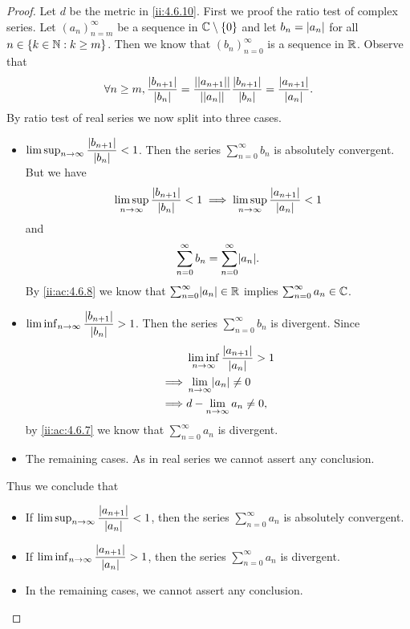 \begin{proof}
  Let \(d\) be the metric in \cref{ii:4.6.10}.
  First we proof the ratio test of complex series.
  Let \((a_n)_{n = m}^\infty\) be a sequence in \(\mathbb{C} \setminus \left\lbrace0\right\rbrace\) and let \(b_n = \left\lvert a_n\right\rvert\) for all \(n \in \left\lbrace k \in \mathbb{N} : k \geq m\right\rbrace\).
  Then we know that \((b_n)_{n = 0}^\infty\) is a sequence in \(\mathbb{R}\).
  Observe that
  \[
    \forall n \geq m, \dfrac{\left\lvert b_{n + 1}\right\rvert}{\left\lvert b_n\right\rvert} = \dfrac{\left\lvert\left\lvert a_{n + 1}\right\rvert\right\rvert}{\left\lvert\left\lvert a_n\right\rvert\right\rvert} \dfrac{\left\lvert b_{n + 1}\right\rvert}{\left\lvert b_n\right\rvert} = \dfrac{\left\lvert a_{n + 1}\right\rvert}{\left\lvert a_n\right\rvert}.
  \]
  By ratio test of real series we now split into three cases.
  \begin{itemize}
    \item \(\limsup_{n \to \infty} \dfrac{\left\lvert b_{n + 1}\right\rvert}{\left\lvert b_n\right\rvert} < 1\).
          Then the series \(\sum_{n = 0}^\infty b_n\) is absolutely convergent.
          But we have
          \[
            \limsup_{n \to \infty} \dfrac{\left\lvert b_{n + 1}\right\rvert}{\left\lvert b_n\right\rvert} < 1 \implies \limsup_{n \to \infty} \dfrac{\left\lvert a_{n + 1}\right\rvert}{\left\lvert a_n\right\rvert} < 1
          \]
          and
          \[
            \sum_{n = 0}^\infty b_n = \sum_{n = 0}^\infty \abs{a_n}.
          \]
          By \cref{ii:ac:4.6.8} we know that \(\sum_{n = 0}^\infty \abs{a_n} \in \R\) implies \(\sum_{n = 0}^\infty a_n \in \mathbb{C}\).
    \item \(\liminf_{n \to \infty} \dfrac{\left\lvert b_{n + 1}\right\rvert}{\left\lvert b_n\right\rvert} > 1\).
          Then the series \(\sum_{n = 0}^\infty b_n\) is divergent.
          Since
          \begin{align*}
                     & \liminf_{n \to \infty} \dfrac{\abs{a_{n + 1}}}{\abs{a_n}} > 1 \\
            \implies & \lim_{n \to \infty} \abs{a_n} \neq 0                          \\
            \implies & d - \lim_{n \to \infty} a_n \neq 0,
          \end{align*}
          by \cref{ii:ac:4.6.7} we know that \(\sum_{n = 0}^\infty a_n\) is divergent.
    \item The remaining cases.
          As in real series we cannot assert any conclusion.
  \end{itemize}
  Thus we conclude that
  \begin{itemize}
    \item If \(\limsup_{n \to \infty} \dfrac{\left\lvert a_{n + 1}\right\rvert}{\left\lvert a_n\right\rvert} < 1\), then the series \(\sum_{n = 0}^\infty a_n\) is absolutely convergent.
    \item If \(\liminf_{n \to \infty} \dfrac{\left\lvert a_{n + 1}\right\rvert}{\left\lvert a_n\right\rvert} > 1\), then the series \(\sum_{n = 0}^\infty a_n\) is divergent.
    \item In the remaining cases, we cannot assert any conclusion.
  \end{itemize}


\end{proof}
